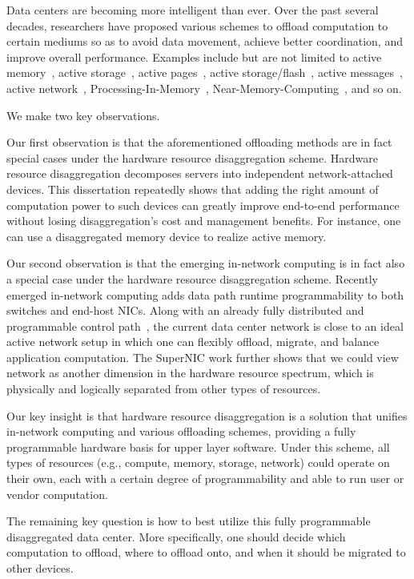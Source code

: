 Data centers are becoming more intelligent than ever.
Over the past several decades, researchers have proposed various
schemes to offload computation to certain mediums so as to
avoid data movement, achieve better coordination, and improve overall performance.
Examples include but are not limited to active memory~\cite{imc-zhang}, active storage~\cite{RiedelEtAl98-ActiveStorage,Willow}, active pages~\cite{ActivePage},
active storage/flash~\cite{ActiveFlash}, active messages~\cite{ActiveMessage}, active network~\cite{active-hotnets20}, Processing-In-Memory~\cite{mutlu2020modern}, Near-Memory-Computing~\cite{singh2019near}, and so on.

We make two key observations.

Our first observation is that the aforementioned offloading methods are
in fact special cases under the hardware resource disaggregation scheme.
%
Hardware resource disaggregation decomposes servers into independent network-attached devices.
This dissertation repeatedly shows that adding the right amount of
computation power to such devices can greatly improve end-to-end performance
without losing disaggregation's cost and management benefits.
For instance, one can use a disaggregated memory device to realize active memory.

Our second observation is that the emerging in-network computing
is in fact also a special case under the hardware resource disaggregation scheme.
%
Recently emerged in-network computing adds data path runtime programmability
to both switches and end-host NICs.
Along with an already fully distributed and programmable control path~\cite{orion-nsdi},
the current data center network is close to
an ideal active network setup in which one can flexibly offload, migrate, and balance application computation.
The SuperNIC work further shows that we could view network as
another dimension in the hardware resource spectrum,
which is physically and logically separated from other types of resources.

Our key insight is that hardware resource disaggregation is a solution
that unifies in-network computing and various offloading schemes,
providing a fully programmable hardware basis for upper layer software.
%
Under this scheme, all types of resources (e.g., compute, memory, storage, network)
could operate on their own, each with a certain degree of programmability and able to run user or vendor computation.

The remaining key question is how to best utilize this fully programmable disaggregated data center. More specifically, one should decide which computation to offload, where to offload onto, and when it should be migrated to other devices.

